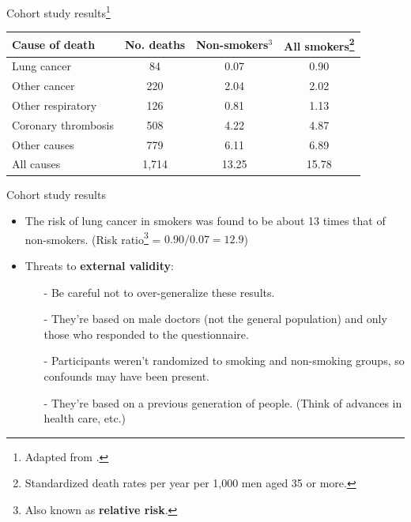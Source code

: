 \documentclass{beamer}
\begin{document}
\begin{frame}{Cohort study results\footnote{\tiny{Adapted from \citet[Table V, p. 1073]{Doll1956}.}}}
	\begin{table} %
	\centering
	\begin{tabular}{ l c c c }
	\toprule
	Cause of death & No. deaths & Non-smokers$^3$ & All smokers\footnote{\tiny{Standardized death rates per year per 1,000 men aged 35 or more.}} \\
	\midrule
	Lung cancer & 84 & \alert{0.07} & \alert{0.90} \\
	Other cancer & 220 & 2.04 & 2.02 \\
	Other respiratory & 126 & 0.81 & 1.13 \\
	Coronary thrombosis & 508 & 4.22 & 4.87 \\
	Other causes & 779 & 6.11 & 6.89 \\
	\midrule
	All causes & 1,714 & 13.25 & 15.78 \\
	\bottomrule
	\end{tabular} 
	\end{table}
\end{frame}

\begin{frame}{Cohort study results \citep{Doll1956}}
	\begin{itemize}
	\item The risk of lung cancer in smokers was found to be about \alert{13 times} that of non-smokers. (Risk ratio\footnote{\tiny{Also known as \textbf{relative risk}.}} = $0.90 / 0.07= 12.9$) 
	\item Threats to \textbf{external validity}:
		\begin{itemize}
		\item[-] Be careful not to over-generalize these results. 
		\item[-] They're based on male doctors (not the general population) and only those who responded to the questionnaire.
		\item[-] Participants weren't randomized to smoking and non-smoking groups, so confounds may have been present.
		\item[-] They're based on a previous generation of people. (Think of advances in health care, etc.) 
		\end{itemize}
	\end{itemize}
\end{frame}
\end{document}
